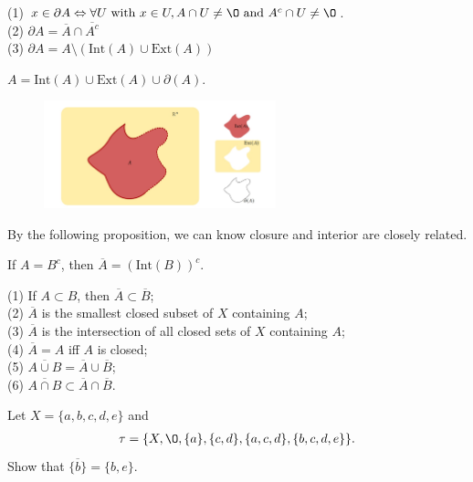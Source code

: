\begin{proposition}{}{}
    (1) $x\in \partial A \Leftrightarrow \forall U \text{ with } x\in U, A\cap U\neq \O \text{ and } A^c\cap U\neq \O$.\\
    (2) $\partial A=\overline{A}\cap\overline{A^c}$\\
    (3) $\partial A=A\setminus (\text{Int}(A)\cup \text{Ext}(A))$
\end{proposition}


\begin{proposition}{}{}
    $A=\text{Int}(A)\cup \text{Ext}(A)\cup \partial(A)$.
\end{proposition}

\begin{figure}[htbp]
    \centering
    \includegraphics[width=0.6\textwidth]{figure/topological_space/int_ext_boundary.png}
    \caption{}
\end{figure}

By the following proposition, we can know closure and interior are closely related.

\begin{proposition}{}{}
   If $A=B^c$, then $\overline{A} = (\text{Int}(B))^c$.
\end{proposition}

\begin{proposition}{}{}
    (1) If $A\subset B$, then $\overline{A}\subset \overline{B}$;\\
    (2) $\overline{A}$ is the smallest closed subset of $X$ containing $A$;\\
    (3) $\overline{A}$ is the intersection of all closed sets of $X$ containing $A$;\\
    (4) $\overline{A}=A$ iff $A$ is closed;\\
    (5) $\overline{A\cup B}=\overline{A}\cup\overline{B}$;\\
    (6) $\overline{A\cap B}\subset \overline{A}\cap \overline{B}$.
\end{proposition}

\begin{example}{}{}
    Let $X=\{a,b,c,d,e\}$ and
    \begin{align*}
        \tau=\{X,\O,\{a\},\{c,d\},\{a,c,d\},\{b,c,d,e\}\}. 
    \end{align*} 
    Show that $\overline{\{b\}} = \{b,e\}$. 
\end{example}



